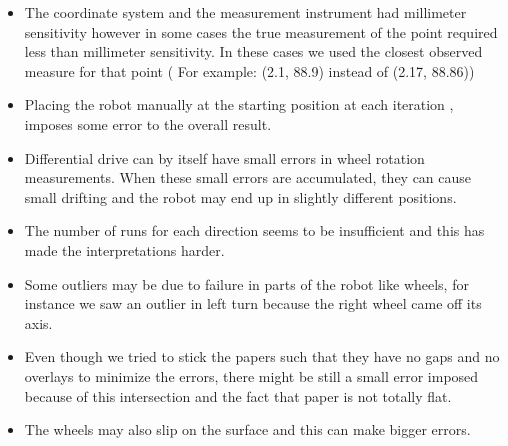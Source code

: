 \documentclass{scrartcl}
\begin{document}
\begin{itemize}
\item The coordinate system and the measurement instrument had millimeter sensitivity however in some cases the true measurement of the point required less than millimeter sensitivity. In these cases we used the closest observed measure for that point ( For example: (2.1, 88.9) instead of (2.17, 88.86)) 
\item Placing the robot manually at the starting position at each iteration , imposes some error to the overall result.
\item Differential drive can by itself have small errors in wheel rotation measurements. When these small errors are accumulated, they can cause small drifting and the robot may end up in slightly different positions. 
\item The number of runs for each direction seems to be insufficient and this has made the interpretations harder. 
\item Some outliers may be due to failure in parts of the robot like wheels, for instance we saw an outlier in left turn because the right wheel came off its axis.  
\item Even though we tried to stick the papers such that they have no gaps and no overlays to minimize the errors, there might be still a small error imposed because of this intersection and the fact that paper is not totally flat.
\item The wheels may also slip on the surface and this can make bigger errors.
\end{itemize}









%




\end{document}
